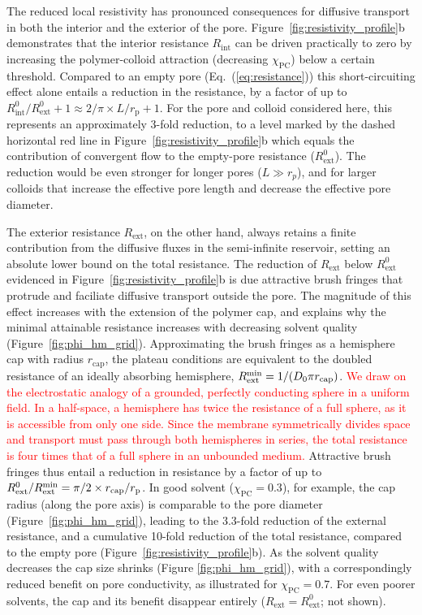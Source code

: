 \documentclass[12pt, a4paper]{article}
\newcommand\todo[1]{\textcolor{red}{#1}}
\begin{document}
The reduced local resistivity has pronounced consequences for diffusive transport in both the interior and the exterior of the pore.
Figure~\ref{fig:resistivity_profile}b demonstrates that the interior resistance $R_{\text{int}}$ can be driven practically to zero by increasing the polymer-colloid attraction (decreasing $\chi_\text{PC}$) below a certain threshold.
Compared to an empty pore (Eq.~(\ref{eq:resistance})) this short-circuiting effect alone entails a reduction in the resistance, by a factor of up to $R^0_{\text{int}}/R^0_{\text{ext}}+1 \approx 2/\pi \times L / r_{\text{p}} + 1$.
For the pore and colloid considered here, this represents an approximately 3-fold reduction, to a level marked by the dashed horizontal red line in Figure~\ref{fig:resistivity_profile}b which equals the contribution of convergent flow to the empty-pore resistance ($R^0_\text{ext}$).
The reduction would be even stronger for longer pores ($L\gg r_p$), and for larger colloids that increase the effective pore length and decrease the effective pore diameter.

The exterior resistance $R_{\text{ext}}$, on the other hand, always retains a finite contribution from the diffusive fluxes in the semi-infinite reservoir, setting an absolute lower bound on the total resistance.
The reduction of $R_{\text{ext}}$ below $R^0_\text{ext}$ evidenced in Figure~\ref{fig:resistivity_profile}b is due attractive brush fringes that protrude and faciliate diffusive transport outside the pore.
The magnitude of this effect increases with the extension of the polymer cap, and explains why the minimal attainable resistance increases with decreasing solvent quality (Figure~\ref{fig:phi_hm_grid}).
Approximating the brush fringes as a hemisphere cap with radius $r_\text{cap}$, the plateau conditions are equivalent to the doubled resistance of an ideally absorbing hemisphere, $R_\text{ext}^\text{\text{min}} = 1 / (D_0 \pi r_\text{cap})$.
\todo{We draw on the electrostatic analogy of a grounded, perfectly conducting sphere in a uniform field.
In a half-space, a hemisphere has twice the resistance of a full sphere, as it is accessible from only one side.
Since the membrane symmetrically divides space and transport must pass through both hemispheres in series, the total resistance is four times that of a full sphere in an unbounded medium.}
Attractive brush fringes thus entail a reduction in resistance by a factor of up to $R_\text{ext}^0 / R_\text{ext}^\text{\text{min}} = \pi/2 \times r_\text{cap}/r_\text{p}$.
In good solvent ($\chi_\text{PC} = 0.3$), for example, the cap radius (along the pore axis) is comparable to the pore diameter (Figure~\ref{fig:phi_hm_grid}), leading to the 3.3-fold reduction of the external resistance, and a cumulative 10-fold reduction of the total resistance, compared to the empty pore (Figure~\ref{fig:resistivity_profile}b).
As the solvent quality decreases the cap size shrinks (Figure \ref{fig:phi_hm_grid}), with a correspondingly reduced benefit on pore conductivity, as illustrated for $\chi_\text{PC} = 0.7$.
For even poorer solvents, the cap and its benefit disappear entirely ($R_\text{ext} = R_\text{ext}^0$; not shown).
\end{document}
